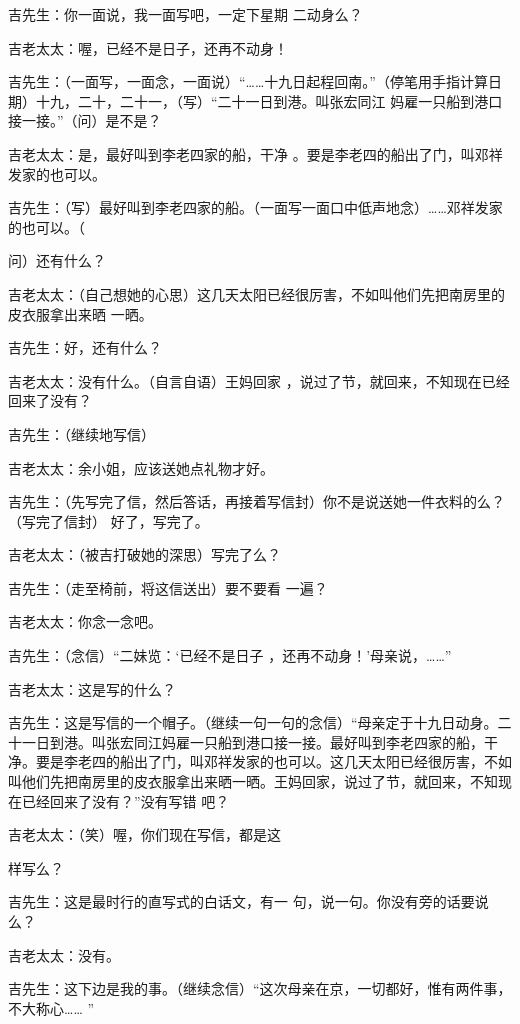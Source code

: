 \documentclass{article}
\begin{document}
吉先生：你一面说，我一面写吧，一定下星期
二动身么？ 

吉老太太：喔，已经不是日子，还再不动身！
 

吉先生：（一面写，一面念，一面说）“……十九日起程回南。”（停笔用手指计算日期）十九，二十，二十一，（写）“二十一日到港。叫张宏同江
妈雇一只船到港口接一接。”（问）是不是？ 

吉老太太：是，最好叫到李老四家的船，干净
。要是李老四的船出了门，叫邓祥发家的也可以。 

吉先生：（写）最好叫到李老四家的船。（一面写一面口中低声地念）……邓祥发家的也可以。（
\newpage

问）还有什么？ 

吉老太太：（自己想她的心思）这几天太阳已经很厉害，不如叫他们先把南房里的皮衣服拿出来晒
一晒。 


吉先生：好，还有什么？ 

吉老太太：没有什么。（自言自语）王妈回家
，说过了节，就回来，不知现在已经回来了没有？ 


吉先生：（继续地写信） 


吉老太太：余小姐，应该送她点礼物才好。 

吉先生：（先写完了信，然后答话，再接着写信封）你不是说送她一件衣料的么？（写完了信封）
好了，写完了。 

吉老太太：（被吉打破她的深思）写完了么？

\newpage

吉先生：（走至椅前，将这信送出）要不要看
一遍？ 


吉老太太：你念一念吧。 

吉先生：（念信）“二妹览：‘已经不是日子
，还再不动身！’母亲说，……” 


吉老太太：这是写的什么？ 

吉先生：这是写信的一个帽子。（继续一句一句的念信）“母亲定于十九日动身。二十一日到港。叫张宏同江妈雇一只船到港口接一接。最好叫到李老四家的船，干净。要是李老四的船出了门，叫邓祥发家的也可以。这几天太阳已经很厉害，不如叫他们先把南房里的皮衣服拿出来晒一晒。王妈回家，说过了节，就回来，不知现在已经回来了没有？”没有写错
吧？ 


吉老太太：（笑）喔，你们现在写信，都是这
\newpage

样写么？ 

吉先生：这是最时行的直写式的白话文，有一
句，说一句。你没有旁的话要说么？ 


吉老太太：没有。 

吉先生：这下边是我的事。（继续念信）“这次母亲在京，一切都好，惟有两件事，不大称心……
” 
\end{document}
